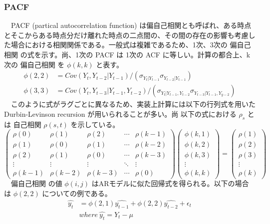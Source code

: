 \documentclass{scrartcl}
\begin{document}
\subsubsection{PACF}
\label{sec:orgab34109}
　PACF (partical autocorrelation function) は偏自己相関とも呼ばれ、ある時点とそこからある時点分だけ離れた時点の二点間の、その間の存在の影響も考慮した場合における相関関係である。一般式は複雑であるため、1次、3次の 偏自己相関 の式を示す。尚、1次の PACF は 1次の ACF に等しい。計算の都合上、k次の 偏自己相関 を \(\phi(k, k)\) と表す。\\
\begin{align}
\phi(2, 2) &= Cov(Y_t,Y_{t-2}|Y_{t-1}) / (\sigma_{Y_t|Y_{t-1}} \sigma_{Y_{t-2}|Y_{t-1}}) \\
\phi(3, 3) &= Cov(Y_t,Y_{t-3}|Y_{t-1},Y_{t-2})/(\sigma_{Y_t|Y_{t-1},Y_{t-2}}\sigma_{Y_{t-3}|Y_{t-1},Y_{y-2}})
\end{align}
　このように式がラグごとに異なるため、実装上計算には以下の行列式を用いた Durbin-Levinson recursion が用いられることが多い。尚 以下の式における \(\rho_s\) とは 自己相関 \(\rho(s, t)\) を示している。\\
\begin{equation}
\left(\begin{array}{ccccc}
\rho(0) & \rho(1) & \rho(2) & \cdots & \rho(k-1) \\
\rho(1) & \rho(0) & \rho(1) & \cdots & \rho(k-2) \\
\rho(2) & \rho(1) & \rho(0) & \cdots & \rho(k-3) \\ 
\vdots  & \vdots  & \vdots  & \ddots & \vdots \\
\rho(k-1) & \rho(k-2) & \rho(k-3) & \cdots & \rho(0)
\end{array}\right)\left(
\begin{array}{c}
\phi(k, 1) \\
\phi(k, 2) \\
\phi(k, 3) \\
\vdots \\
\phi(k, k) 
\end{array}\right)=\left(\begin{array}{c}
\rho(1) \\
\rho(2) \\
\rho(3) \\
\vdots \\
\rho(k) \end{array}\right)
\end{equation}
　偏自己相関 の値 \(\phi(i, j)\) はARモデルに似た回帰式を得られる。以下の場合は \(\phi(2,2)\) についての例である。\\
\begin{align}
\hat{y_t} &= \phi(2,1) \hat{y_{t-1}} + \phi(2,2)\hat{y_{t-2}} + \epsilon_t \nonumber \\
&where \ \hat{y_t} = Y_t - \mu 
\end{align}
\end{document}

